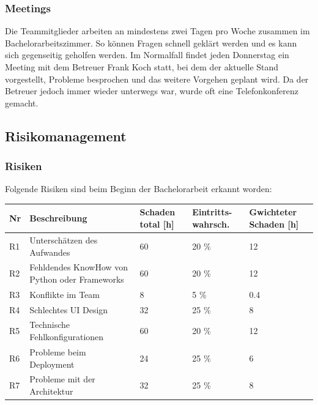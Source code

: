 \subsubsection*{Meetings}
Die Teammitglieder arbeiten an mindestens zwei Tagen pro Woche zusammen im Bachelorarbeitszimmer. So können Fragen schnell geklärt werden und es kann sich gegenseitig geholfen werden. Im Normalfall findet jeden Donnerstag ein Meeting mit dem Betreuer Frank Koch statt, bei dem der aktuelle Stand vorgestellt, Probleme besprochen und das weitere Vorgehen geplant wird. Da der Betreuer jedoch immer wieder unterwegs war, wurde oft eine Telefonkonferenz gemacht.

\subsection{Risikomanagement}
\subsubsection*{Risiken}
Folgende Risiken sind beim Beginn der Bachelorarbeit erkannt worden:

\renewcommand{\arraystretch}{1.2}
\begin{table}[h]
	\centering
	\begin{tabu} to 0.9
	\toprule
	Nr & Beschreibung & Schaden total [h] & Eintritts-wahrsch. & Gwichteter Schaden [h]\\ 
	\midrule
	R1 & Unterschätzen des Aufwandes & 60 & 20 \% & 12 \\
	R2 & Fehldendes KnowHow von \newline Python oder Frameworks & 60 & 20 \% & 12 \\
	R3 & Konflikte im Team & 8 & 5 \% & 0.4 \\
	R4 & Schlechtes UI Design & 32 & 25 \% & 8 \\
	R5 & Technische \newline Fehlkonfigurationen & 60 & 20 \% & 12 \\
	R6 & Probleme beim Deployment & 24 & 25 \% & 6 \\ 
	R7 & Probleme mit der Architektur & 32 & 25 \% & 8 \\
	\bottomrule
	\end{tabu}
\end{table}

